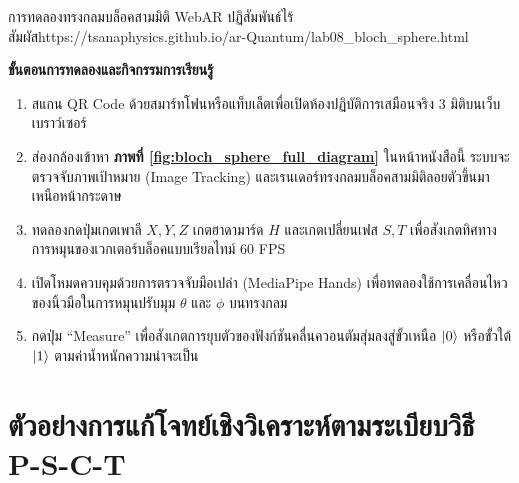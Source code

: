 \begin{qrcodelabbox}{การทดลองทรงกลมบล็อคสามมิติ WebAR ปฏิสัมพันธ์ไร้สัมผัส}{https://tsanaphysics.github.io/ar-Quantum/lab08_bloch_sphere.html}
\begin{minipage}[c]{0.70\textwidth}
\textbf{ขั้นตอนการทดลองและกิจกรรมการเรียนรู้}
\begin{enumerate}
    \item สแกน QR Code ด้วยสมาร์ทโฟนหรือแท็บเล็ตเพื่อเปิดห้องปฏิบัติการเสมือนจริง 3 มิติบนเว็บเบราว์เซอร์
    \item ส่องกล้องเข้าหา \textbf{ภาพที่ \ref{fig:bloch_sphere_full_diagram}} ในหน้าหนังสือนี้ ระบบจะตรวจจับภาพเป้าหมาย (Image Tracking) และเรนเดอร์ทรงกลมบล็อคสามมิติลอยตัวขึ้นมาเหนือหน้ากระดาษ
    \item ทดลองกดปุ่มเกตเพาลี $X, Y, Z$ เกตฮาดามาร์ด $H$ และเกตเปลี่ยนเฟส $S, T$ เพื่อสังเกตทิศทางการหมุนของเวกเตอร์บล็อคแบบเรียลไทม์ 60 FPS
    \item เปิดโหมดควบคุมด้วยการตรวจจับมือเปล่า (MediaPipe Hands) เพื่อทดลองใช้การเคลื่อนไหวของนิ้วมือในการหมุนปรับมุม $\theta$ และ $\phi$ บนทรงกลม
    \item กดปุ่ม ``Measure'' เพื่อสังเกตการยุบตัวของฟังก์ชันคลื่นควอนตัมสุ่มลงสู่ขั้วเหนือ $\ket{0}$ หรือขั้วใต้ $\ket{1}$ ตามค่าน้ำหนักความน่าจะเป็น
\end{enumerate}
\end{minipage}
\hfill
\begin{minipage}[c]{0.25\textwidth}
\centering
{}
\end{minipage}
\end{qrcodelabbox}

\section{ตัวอย่างการแก้โจทย์เชิงวิเคราะห์ตามระเบียบวิธี P-S-C-T}

